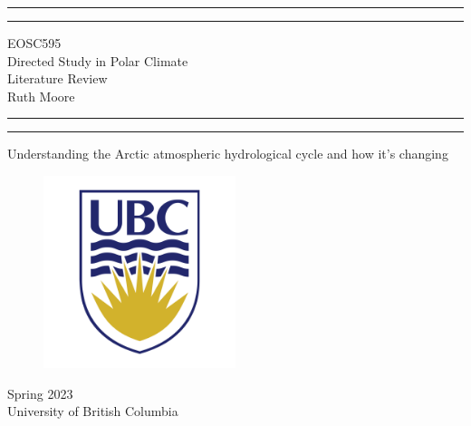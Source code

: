 \documentclass[12pt, oneside]{article}
\begin{document}





\begin{titlepage}
    \centering 
	\scshape
	\vspace*{2\baselineskip}
	\rule{\textwidth}{1.6pt}\vspace*{-\baselineskip}\vspace*{2pt} 
	\rule{\textwidth}{0.4pt} 
	\vspace{0.75\baselineskip} 
	{\Huge EOSC595 \\ Directed Study in Polar Climate} \\
	\vspace{0.1in}
		{\Large Literature Review} \\
		\vspace{0.1in}
		{\Large Ruth Moore} \\
	\vspace{0.75\baselineskip} 
	\rule{\textwidth}{0.4pt}\vspace*{-\baselineskip}\vspace*{2pt} 
		\rule{\textwidth}{1.6pt}
	\vspace*{2\baselineskip} 

\Huge{Understanding the Arctic atmospheric hydrological cycle and how it's changing}
\vspace{0.1in}	

\begin{figure}[hbtp]
\centering
\includegraphics[width=0.5\textwidth]{../ubc-logo-png-transparent.png}
\end{figure}
{\Large Spring 2023} \\
	{\large University of British Columbia} 
\end{titlepage}
\pagestyle{fancy}


{
  \hypersetup{linkcolor=black}
  \tableofcontents
}
\end{document}
